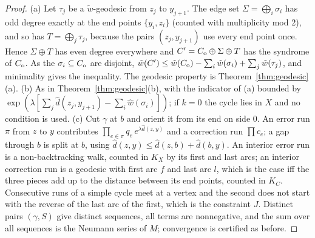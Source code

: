 \begin{proof}
(a) Let $\tau_j$ be a $\tilde w$-geodesic from $z_j$ to $y_{j+1}$. The edge set $\Sigma=\bigoplus_i\sigma_i$ has odd degree exactly at the end points $\{y_i,z_i\}$ (counted with multiplicity mod 2), and so has $T=\bigoplus_j\tau_j$, because the pairs $(z_j,y_{j+1})$ use every end point once. Hence $\Sigma\oplus T$ has even degree everywhere and $C'=C_{\rm o}\oplus\Sigma\oplus T$ has the syndrome of $C_{\rm o}$. As the $\sigma_i\subseteq C_{\rm o}$ are disjoint, $\tilde w(C')\le\tilde w(C_{\rm o})-\sum_i\tilde w(\sigma_i)+\sum_j\tilde w(\tau_j)$, and minimality gives the inequality. The geodesic property is Theorem~\ref{thm:geodesic}(a).
(b) As in Theorem~\ref{thm:geodesic}(b), with the indicator of (a) bounded by $\exp(\lambda[\sum_j\hat d(z_j,y_{j+1})-\sum_i\hat w(\sigma_i)])$; if $k=0$ the cycle lies in $X$ and no condition is used.
(c) Cut $\gamma$ at $b$ and orient it from its end on side $0$. An error run $\pi$ from $z$ to $y$ contributes $\prod_{e\in\pi}q_e\,e^{\lambda\hat d(z,y)}$ and a correction run $\prod c_e$; a gap through $b$ is split at $b$, using $\hat d(z,y)\le\hat d(z,b)+\hat d(b,y)$. An interior error run is a non-backtracking walk, counted in $K_X$ by its first and last arcs; an interior correction run is a geodesic with first arc $f$ and last arc $l$, which is the case iff the three pieces add up to the distance between its end points, counted in $K_C$. Consecutive runs of a simple cycle meet at a vertex and the second does not start with the reverse of the last arc of the first, which is the constraint $J$. Distinct pairs $(\gamma,S)$ give distinct sequences, all terms are nonnegative, and the sum over all sequences is the Neumann series of $M$; convergence is certified as before.
\end{proof}


